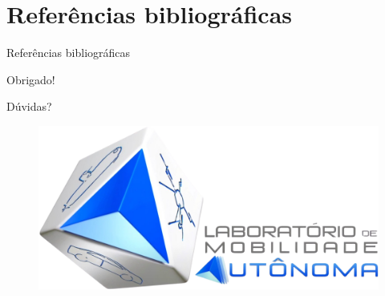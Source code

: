 \documentclass{if-beamer}
\begin{document}
\section{Referências bibliográficas}
\begin{frame}{Referências bibliográficas}
   
\end{frame}



\begin{frame}{}
	
	\begin{block}{}
		
		\centering
		\Huge{Obrigado!}
		
		\LARGE
		
		\vspace{5mm}
		
		Dúvidas?
		
	\end{block}
	
	\vspace{4mm}
	
	\begin{figure}[H]
		\centering
		\includegraphics[width=0.5\linewidth]{img/core/Logo_LMA.png}
	\end{figure}
	
\end{frame}
\end{document}
